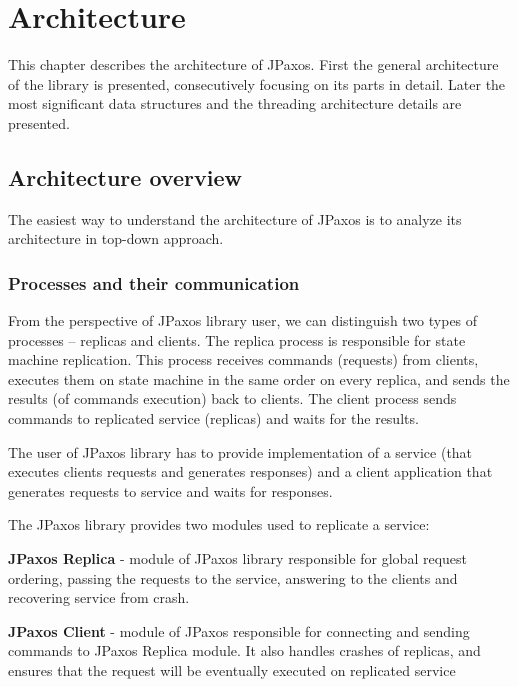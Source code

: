 \chapter{Architecture}

This chapter describes the architecture of JPaxos.
First the general architecture of the library is presented, consecutively focusing on its parts in detail.
Later the most significant data structures and the threading architecture details are presented.

\section{Architecture overview}
\indent\par
The easiest way to understand the architecture of JPaxos is to analyze its architecture in top-down approach.

\subsection{Processes and their communication}

From the perspective of JPaxos library user, we can distinguish two types of processes -- replicas and clients. The replica process is responsible for state machine replication. This process receives commands (requests) from clients, executes them on state machine in the same order on every replica, and sends the results (of commands execution) back to clients. The client process sends commands to replicated service (replicas) and waits for the results. 

The user of JPaxos library has to provide implementation of a service (that executes clients requests and generates responses) and a client application that generates requests to service and waits for responses.

The JPaxos library provides two modules used to replicate a service:
\begin{tightList}
  \item[\textbf{JPaxos Replica}] - module of JPaxos library responsible for global request ordering, passing the requests to the service, answering to the clients and recovering service from crash.
  \item[\textbf{JPaxos Client}] - module of JPaxos responsible for connecting and sending commands to JPaxos Replica module. It also handles crashes of replicas, and ensures that the request will be eventually executed on replicated service
\end{tightList}

